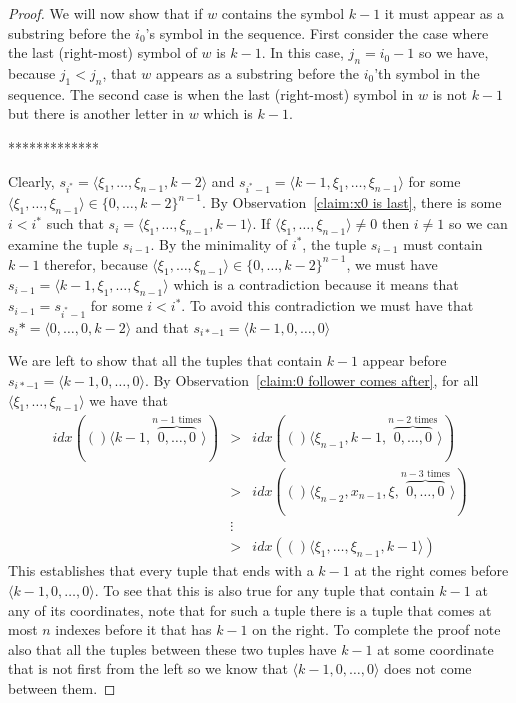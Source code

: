 \documentclass{article}
\theoremstyle{definition}
\newcommand{\T}[1]{\langle{#1}\rangle}
\newcommand{\idx}    [1]{idx(#1)}
\begin{document}
\begin{proof}
	We will now show that if $w$ contains the symbol $k-1$ it must appear as a substring before the $i_0$'s symbol in the sequence. First consider the case where the last (right-most) symbol of $w$ is $k-1$. In this case, $j_n=i_{0}-1$ so we have, because $j_1 < j_n$, that $w$ appears as a substring before the $i_0$'th symbol in the sequence. The second case is when the last (right-most) symbol in $w$ is not $k-1$ but there is another letter in $w$ which is $k-1$.  
	
	
*************	

	
	Clearly, $s_{i^*}=\T{\xi_1,\dots,\xi_{n-1},k-2}$ and $s_{i^*-1}=\T{k-1,\xi_1,\dots,\xi_{n-1}}$ for some $\T{\xi_1,\dots,\xi_{n-1}}\in\{0,\dots,k-2\}^{n-1}$. By Observation~\ref{claim:x0 is last}, there is some $i<i^*$ such that $s_i=\T{\xi_1,\dots,\xi_{n-1},k-1}$. If $\T{\xi_1,\dots,\xi_{n-1}} \neq 0$ then $i \neq 1$ so we can examine the tuple $s_{i-1}$. By the minimality of $i^*$, the tuple $s_{i-1}$ must contain $k-1$ therefor, because $\T{\xi_1,\dots,\xi_{n-1}}\in\{0,\dots,k-2\}^{n-1}$, we must have $s_{i-1}=\T{k-1,\xi_1,\dots,\xi_{n-1}}$ which is a contradiction because it means that $s_{i-1} = s_{i^*-1}$ for some $i<i^*$. To avoid this contradiction we must have that  $s_i*=\T{0,\dots,0,k-2}$ and that $s_{i*-1}=\T{k-1,0,\dots,0}$
	
	We are left to show that all the tuples that contain $k-1$ appear before $s_{i*-1}=\T{k-1,0,\dots,0}$.
	By Observation~\ref{claim:0 follower comes after}, for all $\T{\xi_1,\dots,\xi_{n-1}}$ we have that
	\begin{eqnarray*}
		\idx(\T{k-1,\overbrace{0,\dots ,0}^{n-1 \text{ times}}}) 
		& > & \idx(\T{\xi_{n-1},k-1,\overbrace{0,\dots ,0}^{n-2 \text{ times}}}) \\
		& > & \idx(\T{\xi_{n-2},x_{n-1},\xi,\overbrace{0,\dots ,0}^{n-3 \text{ times}}}) \\    
		& \vdots \\
		& > &  \idx(\T{\xi_1,\dots,\xi_{n-1},k-1})
	\end{eqnarray*}
	This establishes that every tuple that ends with a $k-1$ at the right comes before $\T{k-1,0,\dots ,0}$. To see that this is also true for any tuple that contain $k-1$ at any of its coordinates, note that for such a tuple there is a tuple that comes at most $n$ indexes before it that has $k-1$ on the right. To complete the proof note also that all the tuples between these two tuples have $k-1$ at some coordinate that is not first from the left so we know that $\T{k-1,0,\dots ,0}$ does not come between them. 
\end{proof}
\end{document}
